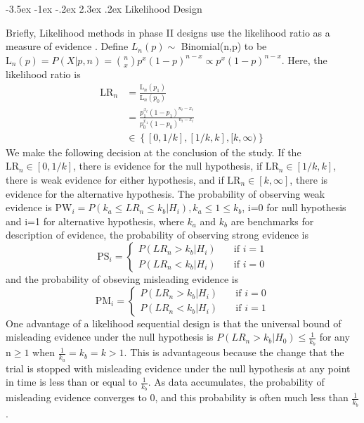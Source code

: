 \documentclass[12pt]{report}\usepackage[]{graphicx}\usepackage[]{color}
\makeatletter
\newlength{\li}\setlength{\li}{14.48pt}
\newlength{\di}\setlength{\di}{-3.5mm}
\renewcommand\section{ \@startsection {section}{1}{\z@}%
                                   {-3.5ex \@plus -1ex \@minus -.2ex}%
                                   {2.3ex \@plus.2ex}%
                                   {\centering\large\fontfamily{qcs}\selectfont}}
\makeatother
\begin{document}
\section{Likelihood Design}

Briefly, Likelihood methods in phase II designs use the likelihood ratio as a measure of evidence \cite{Ayers}. Define $L_n(p) \sim$ Binomial(n,p) to be $\mbox{L}_n(p) = P(X \vert p, n) = {n \choose x} p^x (1-p)^{n-x} \propto p^x (1-p)^{n-x}$. Here, the likelihood ratio is 
\begin{equation*}
\begin{aligned}
\mbox{LR}_n & = \frac{\mbox{L}_n(p_1)}{\mbox{L}_n(p_0)} \\
&= \frac{p_1^{x_t}(1-p_1)^{n_t-x_t}}{p_0^{x_1}(1-p_0)^{n_t-x_t}} \\
& \in \left\{[0, 1/k], [1/k,k], [k, \infty)\right\}
\end{aligned}
\end{equation*}
We make the following decision at the conclusion of the study. If the $\mbox{LR}_n \in [0, 1/k]$, there is evidence for the null hypothesis, if $\mbox{LR}_n \in [1/k,k]$, there is weak evidence for either hypothesis, and if $\mbox{LR}_n \in [k,\infty]$, there is evidence for the alternative hypothesis. The probability of observing weak evidence is $\mbox{PW}_i = P(k_a \leq LR_n \leq k_b | H_i), k_a \leq 1 \leq k_b$, i=0 for null hypothesis and i=1 for alternative hypothesis, where $k_a$ and $k_b$ are benchmarks for description of evidence, the probability of observing strong evidence is 
$$
\mbox{PS}_i = \left\{
        \begin{array}{ll}
            P(LR_n > k_b|H_i) & \quad \text{if } i = 1 \\
            P(LR_n < k_b|H_i) & \quad \text{if } i = 0
        \end{array}
    \right.
$$
and the probability of obseving misleading evidence is 
$$
\mbox{PM}_i = \left\{
        \begin{array}{ll}
            P(LR_n > k_b|H_i) & \quad \text{if } i = 0 \\
            P(LR_n < k_b|H_i) & \quad \text{if } i = 1
        \end{array}
    \right.
$$
One advantage of a likelihood sequential design is that the universal bound of misleading evidence under the null hypothesis is $P(LR_n > k_b|H_0) \leq \frac{1}{k_b}$ for any $\mbox{n} \geq 1$ when $\frac{1}{k_a} = k_b = k > 1$. This is advantageous because the change that the trial is stopped with misleading evidence under the null hypothesis at any point in time is less than or equal to $\frac{1}{k_b}$. As data accumulates, the probability of misleading evidence converges to 0, and this probability is often much less than $\frac{1}{k_b}$ \cite{BlumeNotes} \cite{Blume08}. \\
\end{document}
